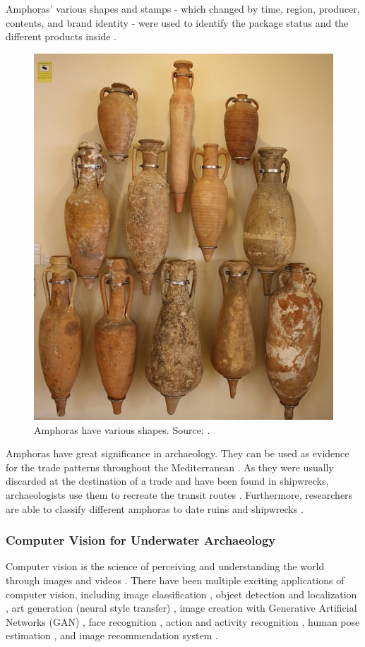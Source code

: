 \documentclass[a4paper, 11pt, oneside]{article}
\begin{document}
  Amphoras' various shapes and stamps - which changed by time, region, producer, contents, and brand
  identity - were used to identify the package status and the different products inside
  \cite{twede2002commercial, worldhistory}.

  \begin{figure}[ht]
    \begin{center}
      \includegraphics[width=.5\textwidth]{amphora_various_shapes.jpg}
    \end{center}
    \caption{Amphoras have various shapes. Source: \cite{worldhistory}.}
    \label{fig:amphora}
  \end{figure}

  Amphoras have great significance in archaeology. They can be used as evidence for the trade patterns throughout
  the Mediterranean \cite{twede2002commercial}. As they were usually discarded at the destination of a trade and have been
  found in shipwrecks, archaeologists use them to recreate the transit routes \cite{twede2002commercial}. Furthermore,
  researchers are able to classify different amphoras to date ruins and shipwrecks
  \cite{twede2002commercial, grace1985middle}.

  \subsubsection{Computer Vision for Underwater Archaeology}

  \label{sec:cvForUnderwater}

  Computer vision is the science of perceiving and understanding the world through images and videos \cite{elgendy2020deep}.
  There have been multiple exciting applications of computer vision, including image classification \cite{rawat2017deep},
  object detection and localization \cite{zhao2019object,liu2020deep}, art generation (neural style transfer)
  \cite{jing2019neural}, image creation with Generative Artificial Networks (GAN) \cite{goodfellow2014generative},
  face recognition \cite{parkhi2015deep}, action and activity recognition \cite{poppe2010survey}, human pose estimation
  \cite{toshev2014deeppose}, and image recommendation system \cite{niu2018neural}.
\end{document}
